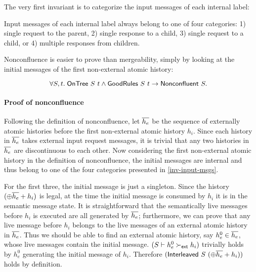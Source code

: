 The very first invariant is to categorize the input messages of each internal label:
\begin{invariant}\label{inv-input-msgs}
  Input messages of each internal label always belong to one of four categories: 1) single request to the parent, 2) single response to a child, 3) single request to a child, or 4) multiple responses from children.
\end{invariant}

Nonconfluence is easier to prove than mergeability, simply by looking at the initial messages of the first non-external atomic history:
\begin{theorem}
  \begin{displaymath}
    \forall S, t.\; \mathsf{OnTree}\ S\ t \land \mathsf{GoodRules}\ S\ t \to \mathsf{Nonconfluent}\ S.
  \end{displaymath}
  \vspace{-15pt}
  \label{thm-ncf}
\end{theorem}

\paragraph{Proof of nonconfluence}
Following the definition of nonconfluence, let $\overline{h_e}$ be the sequence of externally atomic histories before the first non-external atomic history $h_i$.
Since each history in $\overline{h_e}$ takes external input request messages, it is trivial that any two histories in $\overline{h_e}$ are discontinuous to each other.
Now considering the first non-external atomic history in the definition of nonconfluence, the initial messages are internal and thus belong to one of the four categories presented in \autoref{inv-input-msgs}.

For the first three, the initial message is just a singleton.
Since the history $(\oplus \overline{h_e} + h_i)$ is legal, at the time the initial message is consumed by $h_i$ it is in the semantic message state.
It is straightforward that the semantically live messages before $h_i$ is executed are all generated by $\overline{h_e}$; furthermore, we can prove that any live message before $h_i$ belongs to the live messages of an external atomic history in $\overline{h_e}$.
Thus we should be able to find an external atomic history, say $h^0_e \in \overline{h_e}$, whose live messages contain the initial message.
$(S \vdash h^0_e \succ_{\textsf{ext}} h_i)$ trivially holds by $h^0_e$ generating the initial message of $h_i$.
Therefore $(\mathsf{Interleaved}\ S\ (\oplus \overline{h_e} + h_i))$ holds by definition.


